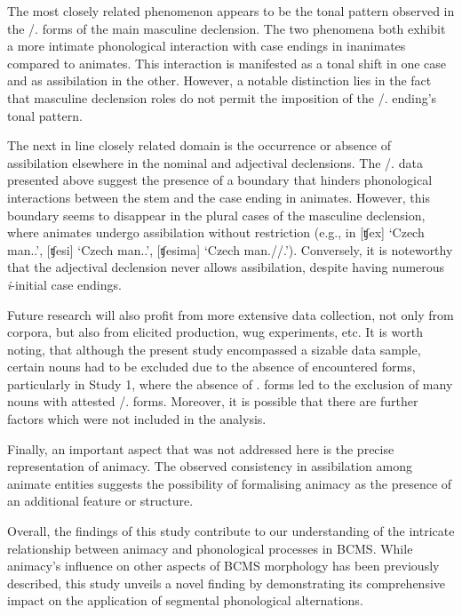 \documentclass[output=paper,colorlinks,citecolor=brown]{langscibook}
\begin{document}
The most closely related phenomenon appears to be the tonal pattern observed in the {\DAT/\LOC.\SG} forms of the main masculine declension. The two phenomena both exhibit a more intimate phonological interaction with case endings in inanimates compared to animates. This interaction is manifested as a tonal shift in one case and as assibilation in the other. However, a notable distinction lies in the fact that masculine declension roles do not permit the imposition of the {\DAT/\LOC.\SG} ending's tonal pattern.

The next in line closely related domain is the occurrence or absence of assibilation elsewhere in the nominal and adjectival declensions. The {\DAT/\LOC.\SG} data presented above suggest the presence of a boundary that hinders phonological interactions between the stem and the case ending in animates. However, this boundary seems to disappear in the plural cases of the masculine declension, where animates undergo assibilation without restriction (e.g., in [{ʧex}] `Czech man.{\NOM.\SG}’, [{ʧesi}] `Czech man.{\NOM.\PL}’, [{ʧesima}] `Czech man.{\DAT/\LOC/\INS.\PL}’). Conversely, it is noteworthy that the adjectival declension never allows assibilation, despite having numerous \textit{i}-initial case endings.

Future research will also profit from more extensive data collection, not only from corpora, but also from elicited production, wug experiments, etc. It is worth noting, that although the present study encompassed a sizable data sample, certain nouns had to be excluded due to the absence of encountered forms, particularly in Study 1, where the absence of {\GEN.\PL} forms led to the exclusion of many nouns with attested {\DAT/\LOC.\SG} forms. Moreover, it is possible that there are further factors which were not included in the analysis. 

Finally, an important aspect that was not addressed here is the precise representation of animacy. The observed consistency in assibilation among animate entities suggests the possibility of formalising animacy as the presence of an additional feature or structure.

Overall, the findings of this study contribute to our understanding of the intricate relationship between animacy and phonological processes in BCMS. While animacy's influence on other aspects of BCMS morphology has been previously described, this study unveils a novel finding by demonstrating its comprehensive impact on the application of segmental phonological alternations.
\end{document}
